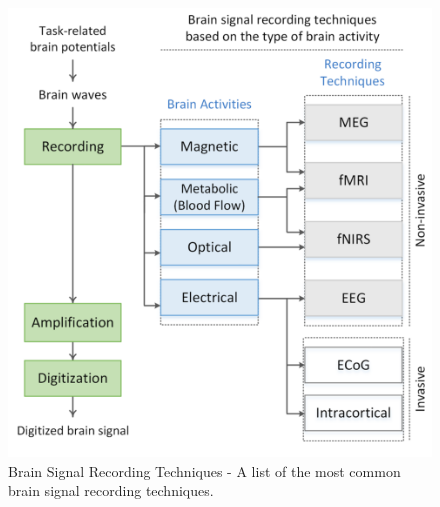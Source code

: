 \begin{figure}[htbp!]
    \centering
    \includegraphics[width=\textwidth]{Figures/Related/brain_signal_recording_techniques}
    \caption{Brain Signal Recording Techniques - A list of the most common brain signal recording techniques.}
\end{figure}
